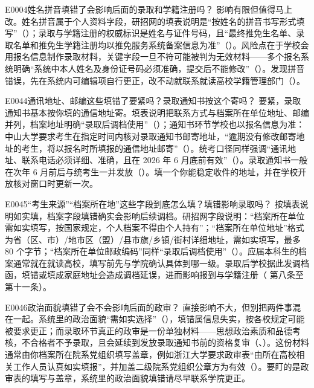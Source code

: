 \begin{qa}{E0004}{姓名拼音填错了会影响后面的录取和学籍注册吗？}
影响有限但值得马上改。姓名拼音属于个人资料字段，研招网的填表说明是“按姓名的拼音书写形式填写”（）；录取与学籍注册的权威标识是姓名与证件号码，且“最终推免生名单、录取名单和推免生学籍注册均以推免服务系统备案信息为准”（）。风险点在于学校会用报名信息制作录取材料，关键字段一旦不符可能被判为无效材料——多个报名系统明确“系统中本人姓名及身份证号码必须准确，提交后不能修改”（）。发现拼音错误，先在系统内可编辑项自行更正，改不动就联系就读高校学籍管理部门（）。
\end{qa}

\begin{qa}{E0044}{通讯地址、邮编这些填错了要紧吗？录取通知书按这个寄吗？}
要紧，录取通知书基本按你填的通信地址寄。填表说明把联系方式与档案所在单位地址、邮编并列，档案地址明确“录取后调档使用”（）；通知书环节学校也以报名信息为准：中山大学要求考生在指定时间内核对录取通知书邮寄地址，“逾期没有修改邮寄地址的考生，将以报名时所填报的通信地址邮寄”（）。统考口径同样强调“通讯地址、联系电话必须详细、准确，且在 2026 年 6 月底前有效”（）。录取通知书一般在次年 6 月前后与统考生一并发放（）。填一个你能稳定收件的地址，并在学校开放核对窗口时更新一次。
\end{qa}

\begin{qa}{E0045}{“考生来源”“档案所在地”这些字段到底怎么填？填错影响录取吗？}
按填表说明如实填，档案字段填错确实会影响后续调档。研招网字段说明：“档案所在单位 需如实填写，按国家规定，个人档案不得由个人持有”；“档案所在单位地址”格式为省（区、市）/地市区（盟）/县市旗/乡镇/街村详细地址，需如实填写，最多 80 个字节；“档案所在单位邮政编码”同样“录取后调档使用”（）。应届本科生的档案通常就在就读高校，填写前先与学院确认具体到哪一级。录取后学校据此发调档函，填错或填成家庭地址会造成调档延误，进而影响报到与学籍注册（ 第八条至第十一条）。
\end{qa}

\begin{qa}{E0046}{政治面貌填错了会不会影响后面的政审？}
直接影响不大，但别把两件事混在一起。系统里的政治面貌“需如实选择”（），填错属信息失实，按各校规定可能被要求更正；而录取环节真正的政审是一份单独材料——思想政治素质和品德考核，不合格者不予录取，且会延续到发放录取通知书前的资格复审（、）。这份材料通常由你档案所在院系党组织填写盖章，例如浙江大学要求政审表“由所在高校相关工作人员认真如实填报”，并加盖二级院系党组织公章方为有效（）。要盯的是政审表的填写与盖章，系统里的政治面貌填错请尽早联系学院更正。
\end{qa}

